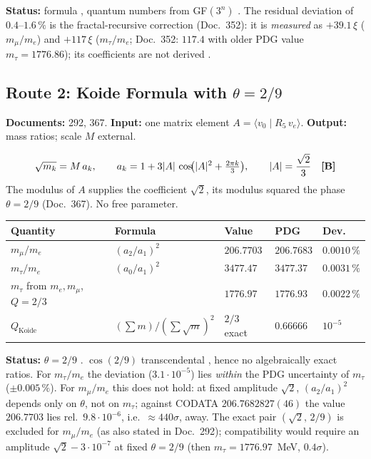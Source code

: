 \textbf{Status:} formula \BM, quantum numbers from GF$(3^n)$ \KM. The residual
deviation of $0{.}4$--$1{.}6\,\%$ is the fractal-recursive correction (Doc.~352):
it is \emph{measured} as $+39{.}1\,\xi$ ($m_\mu/m_e$) and $+117\,\xi$
($m_\tau/m_e$; Doc.~352: $117{.}4$ with older PDG value $m_\tau=1776{.}86$); its coefficients are not derived \SM.

\subsection{Route 2: Koide Formula with $\theta = 2/9$}

\textbf{Documents:} 292, 367. \quad
\textbf{Input:} one matrix element $A = \langle v_0\mid R_5\,v_e\rangle$. \quad
\textbf{Output:} mass ratios; scale $M$ external.

\[
  \sqrt{m_k} = M\,a_k, \qquad
  a_k = 1 + 3|A|\,\cos\!\bigl(|A|^2 + \tfrac{2\pi k}{3}\bigr),
  \qquad |A| = \frac{\sqrt2}{3} \quad \textbf{[B]}
\]
The modulus of $A$ supplies the coefficient $\sqrt2$, its modulus squared the
phase $\theta = 2/9$ (Doc.~367). No free parameter.

\begin{center}
\begin{tabular}{@{}lllll@{}}
\toprule
Quantity & Formula & Value & PDG & Dev. \\
\midrule
$m_\mu/m_e$  & $(a_2/a_1)^2$ & $206{.}7703$ & $206{.}7683$ & $0{.}0010\,\%$ \\
$m_\tau/m_e$ & $(a_0/a_1)^2$ & $3477{.}47$  & $3477{.}37$  & $0{.}0031\,\%$ \\
$m_\tau$ from $m_e,m_\mu$, $Q=2/3$ & & $1776{.}97$ & $1776{.}93$ & $0{.}0022\,\%$ \\
$Q_\text{Koide}$ & $(\sum m)/(\sum\sqrt m)^2$ & $2/3$ exact & $0{.}66666$ & $10^{-5}$ \\
\bottomrule
\end{tabular}
\end{center}

\textbf{Status:} $\theta = 2/9$ \BM. $\cos(2/9)$ transcendental \EM, hence no
algebraically exact ratios. For $m_\tau/m_e$ the deviation ($3.1\cdot10^{-5}$)
lies \emph{within} the PDG uncertainty of $m_\tau$ ($\pm0{.}005\,\%$). For
$m_\mu/m_e$ this does not hold: at fixed amplitude $\sqrt2$, $(a_2/a_1)^2$ depends
only on $\theta$, not on $m_\tau$; against CODATA $206.7682827(46)$ the value
$206.7703$ lies rel.\ $9.8\cdot10^{-6}$, i.e.\ ${\approx}440\sigma$, away. The
exact pair $(\sqrt2,\,2/9)$ is excluded for $m_\mu/m_e$ (as also stated in
Doc.~292); compatibility would require an amplitude $\sqrt2 - 3\cdot10^{-7}$ at
fixed $\theta=2/9$ (then $m_\tau = 1776.97$~MeV, $0.4\sigma$).

